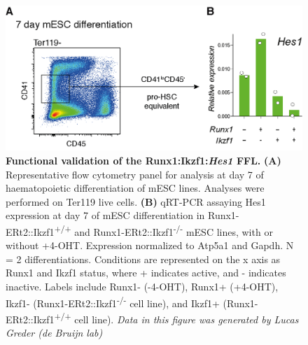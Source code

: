 \begin{figure}[p]
    \centering
    \includegraphics[width=\textwidth,height=\textheight,keepaspectratio]{figures/appendix/app_notch-ffl-validation.png}
    \caption[{Functional validation of the Runx1:Ikzf1:\textit{Hes1} FFL.}]
    {\textbf{Functional validation of the Runx1:Ikzf1:\textit{Hes1} FFL.} 
    \textbf{(A)} Representative flow cytometry panel for analysis at day 7 of haematopoietic differentiation of mESC lines. Analyses were performed on Ter119\uneg{} live cells.
    \textbf{(B)} qRT-PCR assaying Hes1 expression at day 7 of mESC differentiation in Runx1-ERt2::Ikzf1\textsuperscript{+/+} and Runx1-ERt2::Ikzf1\textsuperscript{-/-} mESC lines, with or without +4-OHT. Expression normalized to Atp5a1 and Gapdh. N = 2 differentiations. Conditions are represented on the x axis as Runx1 and Ikzf1 status, where + indicates active, and - indicates inactive. Labels include Runx1- (-4-OHT), Runx1+ (+4-OHT), Ikzf1- (Runx1-ERt2::Ikzf1\textsuperscript{-/-} cell line), and Ikzf1+ (Runx1-ERt2::Ikzf1\textsuperscript{+/+} cell line). 
    \textit{Data in this figure was generated by Lucas Greder (de Bruijn lab)}
    }
    \label{fig:app_notch-ffl-validation}
\end{figure}
\clearpage


